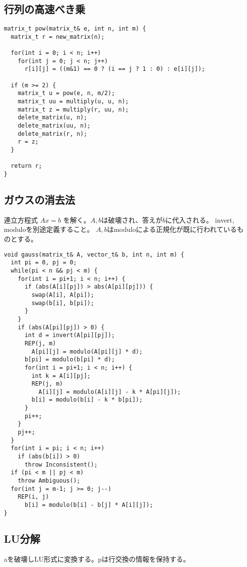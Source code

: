 \subsection{行列の高速べき乗}

\begin{lstlisting}
matrix_t pow(matrix_t& e, int n, int m) {
  matrix_t r = new_matrix(n);
 
  for(int i = 0; i < n; i++)
    for(int j = 0; j < n; j++)
      r[i][j] = ((m&1) == 0 ? (i == j ? 1 : 0) : e[i][j]);
 
  if (m >= 2) {
    matrix_t u = pow(e, n, m/2);
    matrix_t uu = multiply(u, u, n);
    matrix_t z = multiply(r, uu, n);
    delete_matrix(u, n);
    delete_matrix(uu, n);
    delete_matrix(r, n);
    r = z;
  }
 
  return r;
}
\end{lstlisting}


\subsection{ガウスの消去法}

連立方程式 $ Ax=b $ を解く。$A, b$は破壊され、答えが$b$に代入される。
invert, moduloを別途定義すること。
$A, b$はmoduloによる正規化が既に行われているものとする。

\begin{lstlisting}
void gauss(matrix_t& A, vector_t& b, int n, int m) {
  int pi = 0, pj = 0;
  while(pi < n && pj < m) {
    for(int i = pi+1; i < n; i++) {
      if (abs(A[i][pj]) > abs(A[pi][pj])) {
        swap(A[i], A[pi]);
        swap(b[i], b[pi]);
      }
    }
    if (abs(A[pi][pj]) > 0) {
      int d = invert(A[pi][pj]);
      REP(j, m)
        A[pi][j] = modulo(A[pi][j] * d);
      b[pi] = modulo(b[pi] * d);
      for(int i = pi+1; i < n; i++) {
        int k = A[i][pj];
        REP(j, m)
          A[i][j] = modulo(A[i][j] - k * A[pi][j]);
        b[i] = modulo(b[i] - k * b[pi]);
      }
      pi++;
    }
    pj++;
  }
  for(int i = pi; i < n; i++)
    if (abs(b[i]) > 0)
      throw Inconsistent();
  if (pi < m || pj < m)
    throw Ambiguous();
  for(int j = m-1; j >= 0; j--)
    REP(i, j)
      b[i] = modulo(b[i] - b[j] * A[i][j]);
}
\end{lstlisting}


\subsection{LU分解}

aを破壊しLU形式に変換する。pは行交換の情報を保持する。

